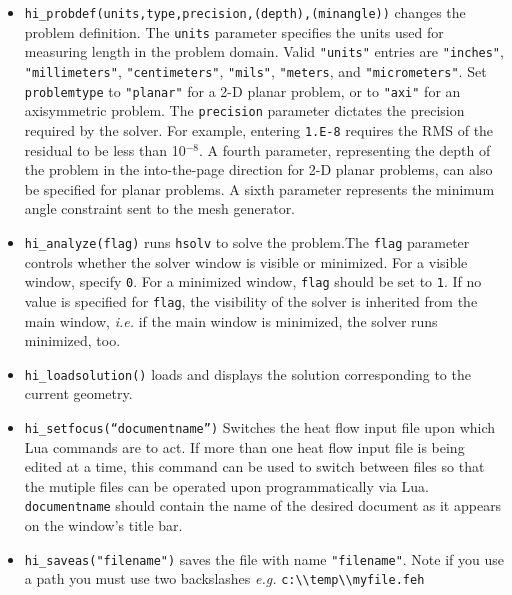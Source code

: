 \begin{itemize}
\item {\tt hi\_probdef(units,type,precision,(depth),(minangle))} changes the problem
definition. The \texttt{units} parameter specifies the units used
for measuring length in the problem domain. Valid \texttt{"units"}
entries are
\texttt{"inches"}, \texttt{"millimeters"}, \texttt{"centimeters"},
\texttt{"mils"}, \texttt{"meters}, and \texttt{"micrometers"}. Set
\texttt{problemtype} to \texttt{"planar"} for a 2-D planar problem, or to
\texttt{"axi"} for an axisymmetric problem. The \texttt{precision} parameter
dictates the precision required by the solver. For example, entering
\texttt{1.E-8} requires the RMS of the residual to be less than 10$^{ - 8}$.
A fourth parameter, representing the depth of the problem in the
into-the-page direction for 2-D planar problems, can also be specified
for planar problems. A sixth parameter represents the minimum angle constraint sent to the mesh generator.

\item {\tt hi\_analyze(flag)} runs \texttt{hsolv} to solve the problem.The {\tt flag} parameter
controls whether the solver window is visible or minimized.  For a
visible window,  specify {\tt 0}. For a minimized window, {\tt flag} should be set to {\tt 1}.
If no value is specified for {\tt flag}, the visibility of the solver is inherited from the main window,
{\em i.e.} if the main window is minimized, the solver runs minimized, too.

\item {\tt hi\_loadsolution()} loads and displays the solution corresponding to the
current geometry.

\item {\tt hi\_setfocus(``documentname'')} Switches the
heat flow input file upon which Lua commands are to act. If
more than one heat flow input file is being edited at a time,
this command can be used to switch between files so that the
mutiple files can be operated upon programmatically via Lua. {\tt
documentname} should contain the name of the desired document as
it appears on the window's title bar.

\item {\tt hi\_saveas("filename")} saves the file with name
\texttt{"filename"}. Note if you use a path you must use two backslashes
{\em e.g.} \verb+c:\\temp\\myfile.feh+

\end{itemize}

